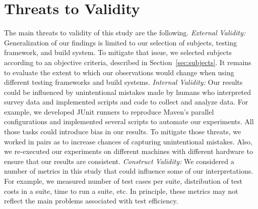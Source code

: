 \section{Threats to Validity}

The main threats to validity of this study are the following.
\textit{External Validity:} Generalization of our findings is limited
to our selection of subjects, testing framework, and build system.  To
mitigate that issue, we selected subjects according to an objective
criteria, described in Section~\ref{sec:subjects}.  It remains to
evaluate the extent to which our observations would change when using
different testing frameworks and build systems.  \textit{Internal
  Validity:} Our results could be influenced by unintentional mistakes
made by humans who interpreted survey data and implemented scripts and
code to collect and analyze data. For example, we developed JUnit
runners to reproduce Maven's parallel configurations and implemented
several scripts to automate our experiments.  All those tasks
could introduce bias in our results.  To mitigate those threats, we
worked in pairs as to increase chances of capturing unintentional
mistakes. Also, we re-executed our experiments on different machines
with different hardware to ensure that our results are consistent.
\textit{Construct Validity:} We considered a number of metrics in this
study that could influence some of our interpretations.  For example,
we measured number of test cases per suite, distribution of test costs
in a suite, time to run a suite, etc.  In principle, these metrics may
not reflect the main problems associated with test
efficiency.

